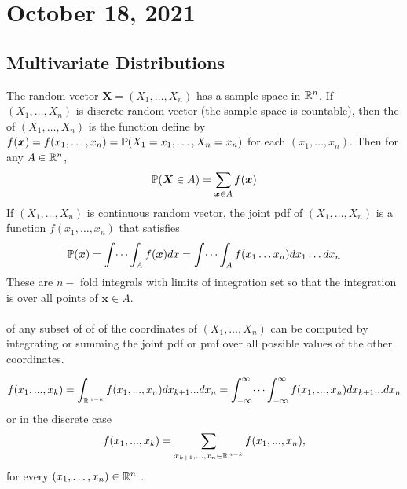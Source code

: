 \section{October 18, 2021}
\subsection{Multivariate Distributions}
The random vector $\boldsymbol{X} = (X_1,\dots,X_n)$ has a sample space in $\mathbb R^n$. If $(X_1,\dots,X_n)$ is discrete random vector (the sample space is countable), then the  of $(X_1,\dots,X_n)$ is the function define by $f(\boldsymbol{x}) = f(x_1,\dots,x_n) = \mathbb P(X_1 =x_1,\dots,X_n=x_n)$ for each $(x_1,\dots,x_n)$. Then for any $A \in \mathbb R^n $,
$$
\mathbb P(\boldsymbol{X} \in A) = \sum_{\boldsymbol{x} \in A} f(\boldsymbol{x})
$$
If $(X_1,\dots,X_n)$ is continuous random vector, the joint pdf of $(X_1,\dots,X_n)$ is a function $f(x_1,\dots,x_n)$ that satisfies 
$$
\mathbb P(\boldsymbol{x}) = \int \dots \int_{A} f(\boldsymbol{x}) dx = \int \dots \int_{A} f(x_1 \dots x_n) dx_1 \dots dx_n
$$
These are $n-$ fold integrals with limits of integration set so that the integration is over all points of $ \boldsymbol{x} \in A$.
\\
\\
 of any subset of of of the coordinates of $(X_1,\dots,X_n)$ can be computed by integrating or summing the joint pdf or pmf over all possible values of the other coordinates. 

\begin{align*}
    f(x_1,...,x_k) = \int_{\mathbb R^{n-k}} f(x_1,...,x_n)dx_{k+1}...dx_{n}
 = \int_{- \infty}^{\infty} \dots \int_{- \infty}^{\infty} f(x_1,...,x_n)dx_{k+1}...dx_{n}
\end{align*}
or in the discrete case
$$
f(x_1,...,x_k) = \sum_{x_{k+1},...,x_n \in \mathbb R^{n-k}} f(x_1,...,x_n), 
$$
for every $(x_1,\dots,x_n) \in \mathbb R^n$ .

